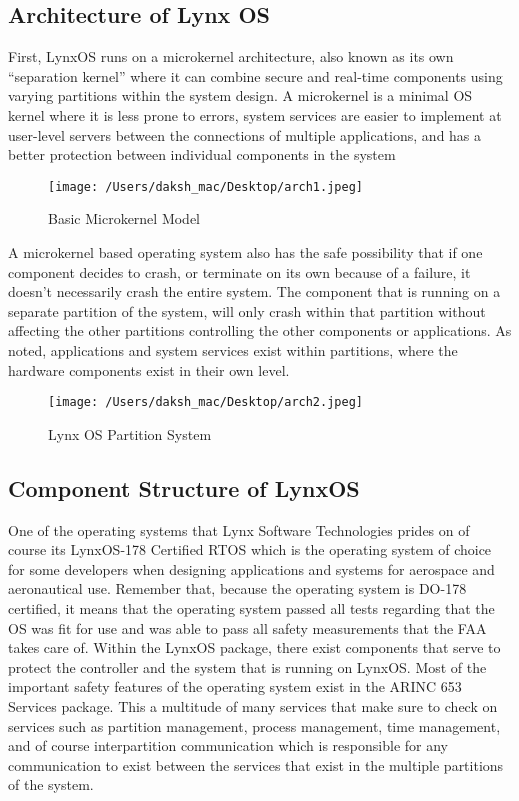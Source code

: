 \documentclass[12pt]{article}
\begin{document}
\subsection{Architecture of Lynx OS}
First, LynxOS runs on a microkernel architecture, also known as its own “separation
kernel” where it can combine secure and real-time components using varying partitions within
the system design. A microkernel is a minimal OS kernel where it is less prone to errors, system
services are easier to implement at user-level servers between the connections of multiple
applications, and has a better protection between individual components in the system \cite{ref:arch}

\begin{figure}[H]
	\centering
	\texttt{[image: /Users/daksh\_mac/Desktop/arch1.jpeg]}
	\caption[About arch]{Basic Microkernel Model}
	\label{fig:arch1}	
\end{figure}


A microkernel based operating system also has the safe possibility that if one component decides
to crash, or terminate on its own because of a failure, it doesn’t necessarily crash the entire
system. The component that is running on a separate partition of the system, will only crash
within that partition without affecting the other partitions controlling the other components or
applications. As noted, applications and system services exist within partitions, where the
hardware components exist in their own level.

\begin{figure}[H]
	\centering
	\texttt{[image: /Users/daksh\_mac/Desktop/arch2.jpeg]}
	\caption[About arch]{Lynx OS Partition System}
	\label{fig:arch1}	
\end{figure}

\subsection{Component Structure of LynxOS}
One of the operating systems that Lynx Software Technologies prides on of course its
LynxOS-178 Certified RTOS which is the operating system of choice for some developers when
designing applications and systems for aerospace and aeronautical use. Remember that, because
the operating system is DO-178 certified, it means that the operating system passed all tests
regarding that the OS was fit for use and was able to pass all safety measurements that the FAA
takes care of. Within the LynxOS package, there exist components that serve to protect the
controller and the system that is running on LynxOS. Most of the important safety features of the
operating system exist in the ARINC 653 Services package. This a multitude of many services
that make sure to check on services such as partition management, process management, time
management, and of course interpartition communication which is responsible for any
communication to exist between the services that exist in the multiple partitions of the system.\\
\end{document}
